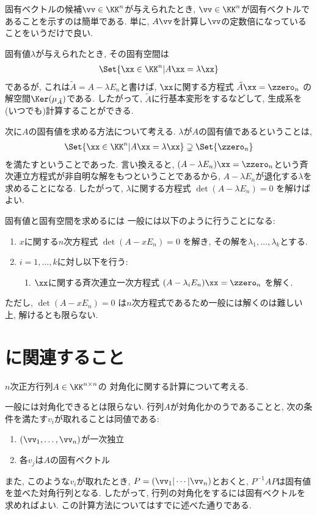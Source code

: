 固有ベクトルの候補$\vv\in \KK^n$が与えられたとき,
$\vv\in \KK^n$が固有ベクトルであることを示すのは簡単である.
単に, $A\vv$を計算し$\vv$の定数倍になっていることをいうだけで良い.

固有値$\lambda$が与えられたとき,
その固有空間は
\begin{align*}
  \Set{\xx\in \KK^n|A\xx=\lambda\xx}
\end{align*}
であるが, これは$\tilde A=A-\lambda E_n$と書けば,
$\xx$に関する方程式
$\tilde A \xx=\zzero_n$
の解空間$\Ker(\mu_{\tilde A})$である.
したがって, $\tilde A$に行基本変形をするなどして,
生成系を(いつでも)計算することができる.

次に$A$の固有値を求める方法について考える.
$\lambda$が$A$の固有値であるということは,
\begin{align*}
  \Set{\xx\in \KK^n|A\xx=\lambda\xx}\supsetneq \Set{\zzero_n}
\end{align*}
を満たすということであった.
言い換えると,
$(A-\lambda E_n)\xx=\zzero_n$という斉次連立方程式が非自明な解をもつということであるから,
$A-\lambda E_n$が退化する$\lambda$を求めることになる.
したがって,
$\lambda$に関する方程式
$\det(A-\lambda E_n)=0$
を解けばよい.

固有値と固有空間を求めるには
一般には以下のように行うことになる:
\begin{enumerate}
\item
  $x$に関する$n$次方程式
  $\det(A-x E_n)=0$
  を解き,
  その解を$\lambda_1,\ldots,\lambda_k$とする.
\item $i=1,\ldots,k$に対し以下を行う:
  \begin{enumerate}
  \item
    $\xx$に関する斉次連立一次方程式
    $(A-\lambda_i E_n)\xx=\zzero_n$
    を解く.
  \end{enumerate}
\end{enumerate}
ただし,
$\det(A-x E_n)=0$
は$n$次方程式であるため一般には解くのは難しい上, 解けるとも限らない.



\section{に関連すること}
$n$次正方行列$A\in\KK^{n\times n}$の
対角化に関する計算について考える.

一般には対角化できるとは限らない.
行列$A$が対角化かのうであることと,
次の条件を満たす$v_i$が取れることは同値である:
\begin{enumerate}
\item $(\vv_1,\ldots,\vv_n)$が一次独立
\item  各$v_j$は$A$の固有ベクトル
\end{enumerate}
また, このような$v_i$が取れたとき,
$P=(\vv_1|\cdots|\vv_n)$とおくと,
$P^{-1}AP$は固有値を並べた対角行列となる.
したがって, 行列の対角化をするには固有ベクトルを求めればよい.
この計算方法についてはすでに述べた通りである.

